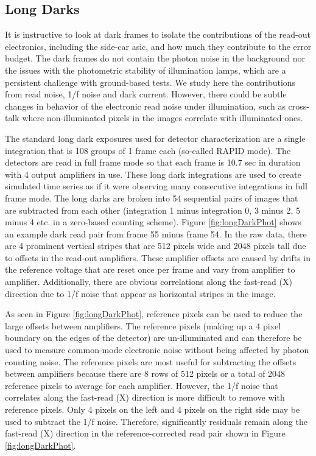 \documentclass{aastex62}
\begin{document}
\subsection{Long Darks}\label{sec:longDarks}

It is instructive to look at dark frames to isolate the contributions of the read-out electronics, including the side-car asic, and how much they contribute to the error budget.
The dark frames do not contain the photon noise in the background nor the issues with the photometric stability of illumination lamps, which are a persistent challenge with ground-based tests.
We study here the contributions from read noise, 1/f noise and dark current.
However, there could be subtle changes in behavior of the electronic read noise under illumination, such as cross-talk where non-illuminated pixels in the images correlate with illuminated ones.

The standard long dark exposures used for detector characterization are a single integration that is 108 groups of 1 frame each (so-called RAPID mode).
The detectors are read in full frame mode so that each frame is 10.7 sec in duration with 4 output amplifiers in use.
These long dark integrations are used to create simulated time series as if it were observing many consecutive integrations in full frame mode.
The long darks are broken into 54 sequential pairs of images that are subtracted from each other (integration 1 minus integration 0, 3 minus 2, 5 minus 4 etc. in a zero-based counting scheme).
Figure \ref{fig:longDarkPhot} shows an example dark read pair from frame 55 minus frame 54.
In the raw data, there are 4 prominent vertical stripes that are 512 pixels wide and 2048 pixels tall due to offsets in the read-out amplifiers.
These amplifier offsets are caused by drifts in the reference voltage that are reset once per frame and vary from amplifier to amplifier.
Additionally, there are obvious correlations along the fast-read (X) direction due to 1/f noise that appear as horizontal stripes in the image.

As seen in Figure \ref{fig:longDarkPhot}, reference pixels can be used to reduce the large offsets between amplifiers.
The reference pixels (making up a 4 pixel boundary on the edges of the detector) are un-illuminated and can therefore be used to measure common-mode electronic noise without being affected by photon counting noise.
The reference pixels are most useful for subtracting the offsets between amplifiers because there are 8 rows of 512 pixels or a total of 2048 reference pixels to average for each amplifier.
However, the 1/f noise that correlates along the fast-read (X) direction is more difficult to remove with reference pixels.
Only 4 pixels on the left and 4 pixels on the right side may be used to subtract the 1/f noise.
Therefore, significantly residuals remain along the fast-read (X) direction in the reference-corrected read pair shown in Figure \ref{fig:longDarkPhot}.
\end{document}

